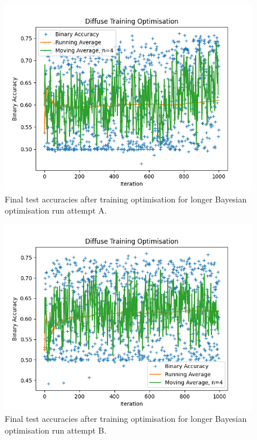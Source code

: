 \begin{figure}[h] 
        \centering \includegraphics[width=\columnwidth]{figures/convplot_testfolders3.png}

        \caption{
                \label{fig:convplot_testfolders3} Final test accuracies after  training optimisation for longer Bayesian optimisation run attempt A.
        }
\end{figure}
\begin{figure}[h] 
        \centering \includegraphics[width=\columnwidth]{figures/convplot_febtry.png}

        \caption{
                \label{fig:convplot_febtry} Final test accuracies after training optimisation for longer Bayesian optimisation run attempt B.
        }
\end{figure}

